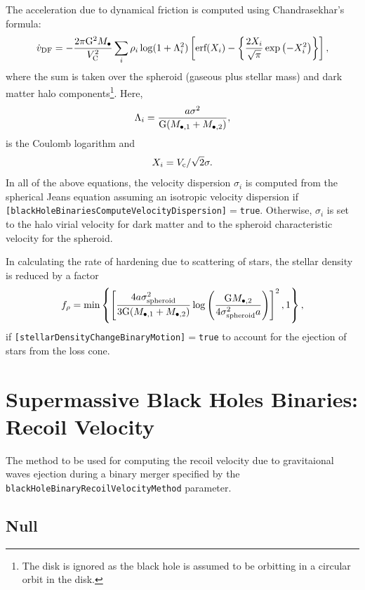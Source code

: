 The acceleration due to dynamical friction is computed using Chandrasekhar's formula:
\begin{equation}
 \dot{v}_{\rm DF}=- {2 \pi {\rm G}^2 M_\bullet \over V_{\rm C}^2} \sum_{i} \rho_i \log(1+\Lambda_i^2) \left[ \hbox{erf}(X_i)-\left\{ {2 X_i \over \sqrt{\pi}} \exp\left(-X_i^2\right) \right\} \right],
\end{equation}
where the sum is taken over the spheroid (gaseous plus stellar mass) and dark matter halo components\footnote{The disk is ignored as the black hole is assumed to be orbitting in a circular orbit in the disk.}. Here,
\begin{equation}
\Lambda_i =  {a \sigma^2  \over {\rm G}(M_{\bullet, 1}+M_{\bullet, 2})},
\end{equation}
is the Coulomb logarithm and
\begin{equation}
X_i = V_{\rm c} / \sqrt{2} \sigma.
\end{equation}
In all of the above equations, the velocity dispersion $\sigma_i$ is computed from the spherical Jeans equation assuming an isotropic velocity dispersion if {\tt [blackHoleBinariesComputeVelocityDispersion]}$=${\tt true}. Otherwise, $\sigma_i$ is set to the halo virial velocity for dark matter and to the spheroid characteristic velocity for the spheroid.

In calculating the rate of hardening due to scattering of stars, the stellar density is reduced by a factor \citep{volonteri_assembly_2003}
\begin{equation}
f_\rho = \hbox{min}\left\{ \left[ { 4 a \sigma_{\rm spheroid}^2 \over 3 {\rm G} (M_{\bullet, 1}+M_{\bullet, 2})} \log\left({{\rm G} M_{\bullet, 2} \over 4 \sigma_{\rm spheroid}^2  a }\right) \right]^2 , 1 \right\},
\end{equation}
if {\tt [stellarDensityChangeBinaryMotion]}$=${\tt true} to account for the ejection of stars from the loss cone.

\section{Supermassive Black Holes Binaries: Recoil Velocity}\label{sec:binaryBlackHoleRecoil}

The method to be used for computing the recoil velocity due to gravitaional waves ejection during a binary merger specified by the {\tt blackHoleBinaryRecoilVelocityMethod} parameter.

\subsection{Null}

